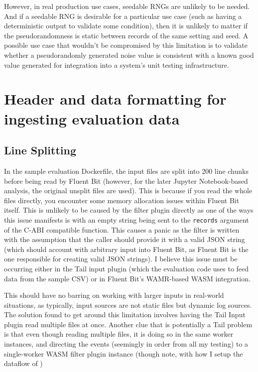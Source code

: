 However, in real production use cases, seedable RNGs are unlikely to be needed. And if a seedable RNG is desirable for a particular use case (such as having a deterministic output to validate some condition), then it is unlikely to matter if the pseudorandomness is static between records of the same setting and seed. A possible use case that wouldn't be compromised by this limitation is to validate whether a pseudorandomly generated noise value is consistent with a known good value generated for integration into a system's unit testing infrastructure. 


\section{Header and data formatting for ingesting evaluation data}
\subsection{Line Splitting} \label{splitting}
In the sample evaluation Dockerfile, the input files are split into 200 line chunks before being read by Fluent Bit (however, for the later Jupyter Notebook-based analysis, the original unsplit files are used). This is because if you read the whole files directly, you encounter some memory allocation issues within Fluent Bit itself. This is unlikely to be caused by the filter plugin directly as one of the ways this issue manifests is with an empty string being sent to the \texttt{records} argument of the C-ABI compatible function. This causes a panic as the filter is written with the assumption that the caller should provide it with a valid JSON string (which should account with arbitrary input into Fluent Bit, as Fluent Bit is the one responsible for creating valid JSON strings). I believe this issue must be occurring either in the Tail input plugin (which the evaluation code uses to feed data from the sample CSV) or in Fluent Bit's WAMR-based WASM integration. 

This should have no barring on working with larger inputs in real-world situations, as typically, input sources are not static files but dynamic log sources. The solution found to get around this limitation involves having the Tail Input plugin read multiple files at once. Another clue that is potentially a Tail problem is that even though reading multiple files, it is doing so in the same worker instances, and directing the events (seemingly in order from all my testing) to a single-worker WASM filter plugin instance (though note, with how I setup the dataflow of ) 

